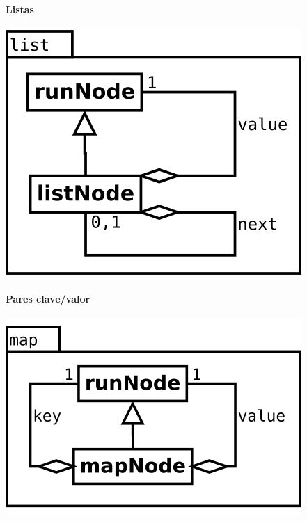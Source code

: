 \paragraph {Listas}
\begin{center}
\includegraphics[scale=0.4]{list.png} \\
\end{center}

\paragraph {Pares clave/valor}
\begin{center}
\includegraphics[scale=0.4]{map.png} \\
\end{center}

